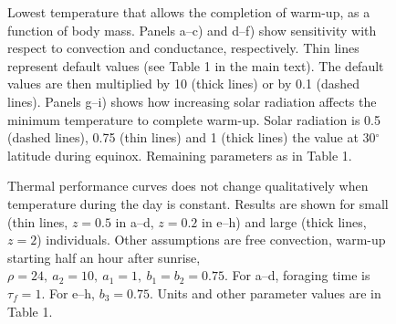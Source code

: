 \documentclass[11pt]{article}
\begin{document}
\begin{figure}
	\caption{
		\setstretch{\stretchby}
		Lowest temperature that allows the completion of warm-up, as a function of body mass.
		Panels a--c) and d--f) show sensitivity with respect to convection and conductance, respectively.
		Thin lines represent default values (see Table 1 in the main text).
		The default values are then multiplied by 10 (thick lines) or by 0.1 (dashed lines).
		Panels g--i) shows how increasing solar radiation affects the minimum temperature to complete warm-up.
		Solar radiation is 0.5 (dashed lines), 0.75 (thin lines) and 1 (thick lines) the value at 30$^\circ$ latitude during equinox.
		Remaining parameters as in Table 1.
	}
	\label{fig:min}
\end{figure}


\begin{figure}
		\caption{
			\setstretch{\stretchby}
			Thermal performance curves does not change qualitatively when temperature during the day is constant.
			Results are shown for small (thin lines, $z = 0.5$ in a--d, $z = 0.2$ in e--h) and large (thick lines, $z = 2$) individuals.
			Other assumptions are free convection, warm-up starting half an hour after sunrise, $\rho = 24,\ a_2 = 10, \ a_1 = 1, \ b_1 = b_2 = 0.75 $.
	    For a--d, foraging time is $\tau_f = 1$.
	    For e--h, $b_3 = 0.75$.
	    Units and other parameter values are in Table 1.
		}
	\label{fig:therm}
\end{figure}


\end{document}
